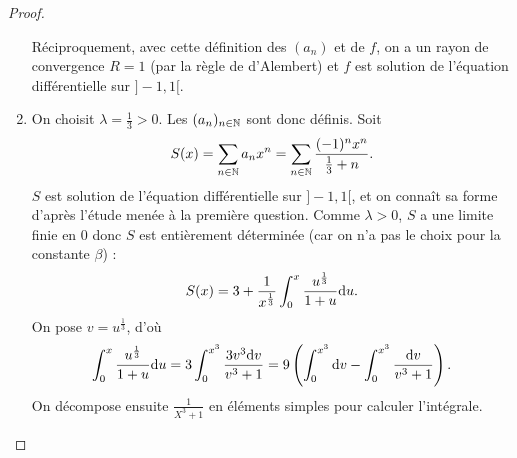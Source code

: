 \documentclass[12pt]{article}
\begin{document}
\begin{proof}
\begin{enumerate}
		Réciproquement, avec cette définition des $(a_n)$ et de $f$, on a un rayon de convergence $R=1$ (par la règle de d'Alembert) et $f$ est solution de l'équation différentielle sur $]-1,1[$.

		\item On choisit $\lambda=\frac{1}{3}>0$. Les $(a_n)_{n\in\mathbb{N}}$ sont donc définis. Soit 
		\begin{equation}
			S(x)=\sum_{n\in\mathbb{N}}a_nx^{n}=\sum_{n\in\mathbb{N}}\frac{(-1)^{n}x^{n}}{\frac{1}{3}+n}.
		\end{equation}
		$S$ est solution de l'équation différentielle sur $]-1,1[$, et on connaît sa forme d'après l'étude menée à la première question. Comme $\lambda>0$, $S$ a une limite finie en 0 donc $S$ est entièrement déterminée (car on n'a pas le choix pour la constante $\beta$) :
		\begin{equation}
			S(x)=3+\frac{1}{x^{\frac{1}{3}}}\int_{0}^{x}\frac{u^{\frac{1}{3}}}{1+u}\mathrm{d} u.
		\end{equation}
		On pose $v=u^{\frac{1}{3}}$, d'où 
		\begin{equation}
			\int_{0}^{x}\frac{u^{\frac{1}{3}}}{1+u}\mathrm{d} u=3\int_{0}^{x^{3}}\frac{3v^{3}\mathrm{d} v}{v^{3}+1}=9\left(\int_{0}^{x^{3}}\mathrm{d} v-\int_{0}^{x^{3}}\frac{\mathrm{d} v}{v^{3}+1}\right).
		\end{equation}
		On décompose ensuite $\frac{1}{X^{3}+1}$ en éléments simples pour calculer l'intégrale.
	\end{enumerate}
\end{proof}
\end{document}
